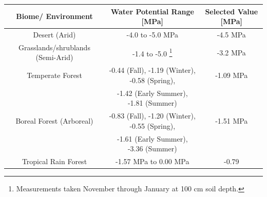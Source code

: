 \documentclass[12pt]{article}
\begin{document}
\begin{savenotes}
	\begin{table}[H]
		\begin{center}
			\begin{adjustbox}{width=1\textwidth}
			\begin{tabular}{|c c c|} 
				\hline
				Biome/ Environment & Water Potential Range [MPa] & Selected Value [MPa] \\ [0.5ex] 
				\hline\hline
				Desert (Arid) & -4.0 to -5.0 MPa \cite{Nilsen1983} & -4.5 MPa \\ 
				\hline
				Grasslands/shrublands (Semi-Arid) & -1.4 to -5.0 \footnote{Measurements taken November through January at 100 cm soil depth.} \cite{Pelaez1994} & -3.2 MPa\\
				\hline
				Temperate Forest & -0.44 (Fall), -1.19 (Winter), -0.58 (Spring), & -1.09 MPa\\
				&-1.42 (Early Summer), -1.81 (Summer) \cite{Zobel2001}&\\
				\hline
				Boreal Forest (Arboreal) & -0.83 (Fall), -1.20 (Winter), -0.55 (Spring),& -1.51 MPa\\
				&-1.61 (Early Summer), -3.36 (Summer) \cite{Zobel2001} &\\
				\hline
				Tropical Rain Forest & -1.57 MPa to 0.00 MPa \cite{Kupers2019} & -0.79 \\
				\hline
			\end{tabular}
			\end{adjustbox}
		\vspace*{-3ex}
		\label{table4}
		\end{center}
	\end{table}
\end{savenotes}
\end{document}
